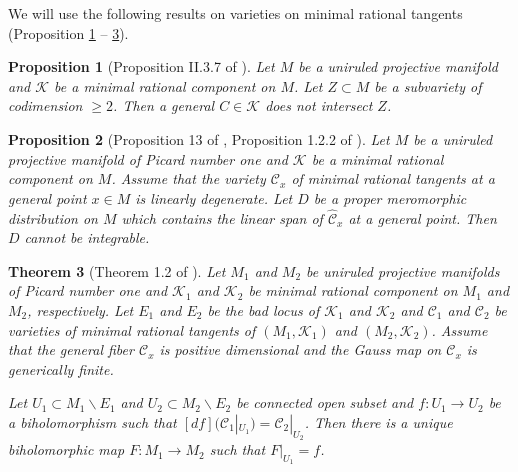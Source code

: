 \documentclass[12pt]{amsart}
\theoremstyle{plain}
\newtheorem{theorem} {Theorem} [section]
\newtheorem{proposition}[theorem]{Proposition}
\theoremstyle{definition}
\begin{document}
We will use the following results on varieties on minimal rational tangents (Proposition \ref{general mrc not intersect  codimension 2 subvariety}  -- \ref{Cartan-Fubini}).

\begin{proposition}[Proposition II.3.7 of \cite{Kol}] \label{general mrc not intersect  codimension 2 subvariety} Let $M$ be a uniruled projective manifold and $\mathcal K$ be a minimal rational component on $M$. Let $Z \subset M$ be a subvariety of codimension $\geq 2$. Then   a general $C \in \mathcal K$   does not intersect $Z$.
\end{proposition}


\begin{proposition} [Proposition 13 of \cite{HM98}, Proposition 1.2.2 of \cite{HM99}] \label{non-integrability}   Let $M$ be a uniruled projective manifold of Picard number one and $\mathcal K$ be a minimal rational component on $M$.
Assume that the variety $\mathcal C_x$ of minimal rational tangents at a general point $x \in M$ is linearly degenerate. Let $D$ be a proper meromorphic distribution on $M$ which contains the linear span of $\widehat{\mathcal C}_x$ at a general point. Then $D$ cannot be integrable.
\end{proposition}


\begin{theorem} [Theorem 1.2 of \cite{HM01}] \label{Cartan-Fubini} Let $M_1$ and $M_2$ be  uniruled projective manifolds of Picard number one and $\mathcal K_1$ and $\mathcal K_2$ be  minimal rational component on $M_1$ and $M_2$, respectively.
Let $E_1$ and $E_2$ be the bad locus of $\mathcal K_1$ and $\mathcal K_2$ and $\mathcal C_1 $ and $\mathcal C_2$ be varieties of minimal rational tangents of $(M_1, \mathcal K_1)$ and $(M_2, \mathcal K_2)$.
Assume that the general fiber $\mathcal C_x$  is positive dimensional and the Gauss map on
$\mathcal C_x$ is generically finite.

Let $U_1 \subset M_1 \backslash E_1$ and $U_2 \subset M_2 \backslash E_2$ be connected open subset and $f: U_1\rightarrow  U_2$ be a biholomorphism such that $[df](\mathcal C_1|_{U_1}) = \mathcal C_2|_{U_2}$.
Then there is a unique biholomorphic map $F: M_1 \rightarrow M_2$ such that $F|_{U_1} = f$.

\end{theorem}
\end{document}
